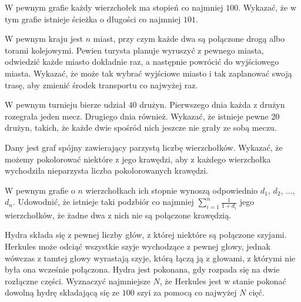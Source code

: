 \begin{problem}{1}
	W pewnym grafie każdy wierzchołek ma stopień co najmniej $100$. Wykazać, że w tym grafie istnieje ścieżka o długości co najmniej $101$.
\end{problem}

\begin{problem}{2}
	W pewnym kraju jest $n$ miast, przy czym każde dwa są połączone drogą albo torami kolejowymi. Pewien turysta planuje wyruszyć z pewnego miasta, odwiedzić każde miasto dokładnie raz, a następnie powrócić do wyjściowego miasta. Wykazać, że może tak wybrać wyjściowe miasto i tak zaplanować swoją trasę, aby zmienić środek transportu co najwyżej raz.
\end{problem}

\begin{problem}{3}
	W pewnym turnieju bierze udział $40$ drużyn. Pierwszego dnia każda z drużyn rozegrała jeden mecz. Drugiego dnia również. Wykazać, że istnieje pewne $20$ drużyn, takich, że każde dwie spośród nich jeszcze nie grały ze sobą meczu.
\end{problem}

\begin{problem}{4}
	Dany jest graf spójny zawierający parzystą liczbę wierzchołków. Wykazać, że możemy pokolorować niektóre z jego krawędzi, aby z każdego wierzchołka wychodziła nieparzysta liczba pokolorowanych krawędzi.
\end{problem}


\begin{problem}{5}
	W pewnym grafie o $n$ wierzchołkach ich stopnie wynoszą odpowiednio $d_1$, $d_2$, ..., $d_n$. Udowodnić, że istnieje taki podzbiór co najmniej $\sum^{n}_{i = 1} \frac{1}{1 + d_i}$ jego wierzchołków, że żadne dwa z nich nie są połączone krawędzią.
\end{problem}

\begin{problem}{6}
	Hydra składa się z pewnej liczby głów, z której niektóre są połączone szyjami. Herkules może odciąć wszystkie szyje wychodzące z pewnej głowy, jednak wówczas z tamtej głowy wyrastają szyje, którą łączą ją z głowami, z którymi nie była ona wcześnie połączona. Hydra jest pokonana, gdy rozpada się na dwie rozłączne części. Wyznaczyć najmniejsze $N$, że Herkules jest w stanie pokonać dowolną hydrę składającą się ze $100$ szyi za pomocą co najwyżej $N$ cięć.
\end{problem}
